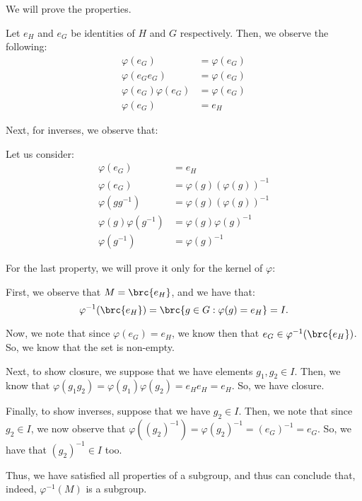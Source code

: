 \documentclass[openany]{book}
\begin{document}
\begin{solution}
	We will prove the properties.
	\begin{innerproof}
		Let $e_H$ and $e_G$ be identities of $H$ and $G$ respectively. Then, we observe the following:
		\begin{align*}
			\varphi(e_G) &= \varphi(e_G) \\
			\varphi(e_Ge_G) &= \varphi(e_G) \\
			\varphi(e_G)\varphi(e_G) &= \varphi(e_G) \\
			 \varphi(e_G) &= e_H
		\end{align*}
	\end{innerproof}

	Next, for inverses, we observe that:
	\begin{innerproof}
		Let us consider:
		\begin{align*}
			\varphi(e_G) &= e_H \\
			\varphi(e_G) &= \varphi(g)(\varphi(g))^{-1} \\
			\varphi(gg^{-1}) &= \varphi(g)(\varphi(g))^{-1} \\
			\varphi(g)\varphi(g^{-1}) &= \varphi(g)\varphi(g)^{-1} \\
			\varphi(g^{-1}) &= \varphi(g)^{-1}
		\end{align*}
	\end{innerproof}

	For the last property, we will prove it only for the kernel of $\varphi$:
	\begin{innerproof}
		First, we observe that $M = \brc{e_H}$, and we have that:
		\begin{equation*}
			\varphi^{-1}(\brc{e_H}) = \brc{g \in G : \varphi(g) = e_H} = I.
		\end{equation*}
	
		Now, we note that since $\varphi(e_G) = e_H$, we know then that $e_G \in \varphi^{-1}(\brc{e_H})$. So, we know that the set is non-empty.
		
		Next, to show closure, we suppose that we have elements $g_1, g_2 \in I$. Then, we know that $\varphi(g_1g_2) = \varphi(g_1)\varphi(g_2) = e_He_H = e_H$. So, we have closure.
		
		Finally, to show inverses, suppose that we have $g_2 \in I$. Then, we note that since $g_2 \in I$, we now observe that $\varphi( (g_2)^{-1} ) = \varphi(g_2)^{-1} = (e_G)^{-1} = e_G$. So, we have that $(g_2)^{-1} \in I$ too.
		
		Thus, we have satisfied all properties of a subgroup, and thus can conclude that, indeed, $\varphi^{-1}(M)$ is a subgroup.
  	\end{innerproof}
\end{solution}
\end{document}
